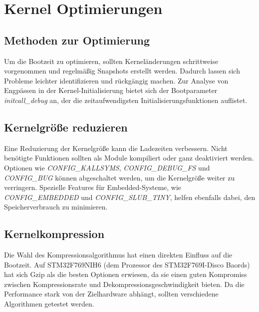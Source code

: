
\section{Kernel Optimierungen}

\subsection{Methoden zur Optimierung}
Um die Bootzeit zu optimieren, sollten Kerneländerungen schrittweise vorgenommen und regelmäßig Snapshots erstellt werden. Dadurch lassen sich Probleme leichter identifizieren und rückgängig machen. Zur Analyse von Engpässen in der Kernel-Initialisierung bietet sich der Bootparameter \textit{initcall\_debug} an, der die zeitaufwendigsten Initialisierungsfunktionen auflistet.

\subsection{Kernelgröße reduzieren}
Eine Reduzierung der Kernelgröße kann die Ladezeiten verbessern. Nicht benötigte Funktionen sollten als Module kompiliert oder ganz deaktiviert werden. Optionen wie \textit{CONFIG\_KALLSYMS}, \textit{CONFIG\_DEBUG\_FS} und \textit{CONFIG\_BUG} können abgeschaltet werden, um die Kernelgröße weiter zu verringern. Spezielle Features für Embedded-Systeme, wie \textit{CONFIG\_EMBEDDED} und \textit{CONFIG\_SLUB\_TINY}, helfen ebenfalls dabei, den Speicherverbrauch zu minimieren.

\subsection{Kernelkompression}
Die Wahl des Kompressionsalgorithmus hat einen direkten Einfluss auf die Bootzeit. Auf STM32F769NIH6 (dem Prozessor des STM32F769I-Disco Baords) hat sich Gzip als die besten Optionen erwiesen, da sie einen guten Kompromiss zwischen Kompressionsrate und Dekompressionsgeschwindigkeit bieten. Da die Performance stark von der Zielhardware abhängt, sollten verschiedene Algorithmen getestet werden.


